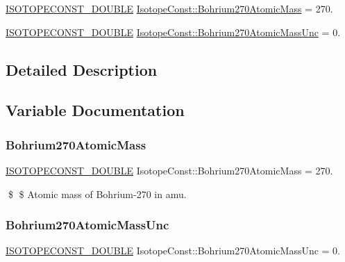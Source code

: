\begin{DoxyCompactItemize}
\item 
\mbox{\hyperlink{group___isotope_const-_macros_ga8f45a7272ce02c0b4c65c44636ed719a}{I\+S\+O\+T\+O\+P\+E\+C\+O\+N\+S\+T\+\_\+\+D\+O\+U\+B\+LE}} \mbox{\hyperlink{group___isotope_const-_bohrium-_bh270_ga16f0a02d46f7cbb2048b3a552b5c522c}{Isotope\+Const\+::\+Bohrium270\+Atomic\+Mass}} = 270.
\item 
\mbox{\hyperlink{group___isotope_const-_macros_ga8f45a7272ce02c0b4c65c44636ed719a}{I\+S\+O\+T\+O\+P\+E\+C\+O\+N\+S\+T\+\_\+\+D\+O\+U\+B\+LE}} \mbox{\hyperlink{group___isotope_const-_bohrium-_bh270_ga87eec34397f4bb5c3dba6fc24da74fa0}{Isotope\+Const\+::\+Bohrium270\+Atomic\+Mass\+Unc}} = 0.
\end{DoxyCompactItemize}


\subsection{Detailed Description}


\subsection{Variable Documentation}
\mbox{\label{group___isotope_const-_bohrium-_bh270_ga16f0a02d46f7cbb2048b3a552b5c522c}} 
\subsubsection{\texorpdfstring{Bohrium270\+Atomic\+Mass}{Bohrium270AtomicMass}}
{\footnotesize\ttfamily \mbox{\hyperlink{group___isotope_const-_macros_ga8f45a7272ce02c0b4c65c44636ed719a}{I\+S\+O\+T\+O\+P\+E\+C\+O\+N\+S\+T\+\_\+\+D\+O\+U\+B\+LE}} Isotope\+Const\+::\+Bohrium270\+Atomic\+Mass = 270.}

\$ \$ Atomic mass of Bohrium-\/270 in amu. \mbox{\label{group___isotope_const-_bohrium-_bh270_ga87eec34397f4bb5c3dba6fc24da74fa0}} 
\subsubsection{\texorpdfstring{Bohrium270\+Atomic\+Mass\+Unc}{Bohrium270AtomicMassUnc}}
{\footnotesize\ttfamily \mbox{\hyperlink{group___isotope_const-_macros_ga8f45a7272ce02c0b4c65c44636ed719a}{I\+S\+O\+T\+O\+P\+E\+C\+O\+N\+S\+T\+\_\+\+D\+O\+U\+B\+LE}} Isotope\+Const\+::\+Bohrium270\+Atomic\+Mass\+Unc = 0.}

